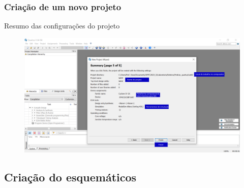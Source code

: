 \documentclass{CPSPresentation}
\begin{document}
\begin{frame}
	\frametitle{Criação de um novo projeto}
	
	\begin{block}{}
		\justifying
		Resumo das configurações do projeto
	\end{block}
	
	\begin{figure}[h]
		\centering
		\includegraphics[width=1.02\textwidth]{quartus/fig25.pdf}
	\end{figure}
	
	
\end{frame}

\subsection{Criação do esquemáticos}
\end{document}
